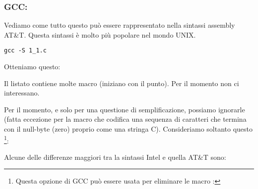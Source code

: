 \subsubsection{GCC: \ATTSyntax}
\label{ATT_syntax}

Vediamo come tutto questo può essere rappresentato nella sintassi assembly AT\&T.
Questa sintassi è molto più popolare nel mondo UNIX.

\begin{lstlisting}[caption=compiliamo in GCC 4.7.3]
gcc -S 1_1.c
\end{lstlisting}

Otteniamo questo:



Il listato contiene molte macro (iniziano con il punto). Per il momento non ci interessano.

Per il momento, e solo per una questione di semplificazione, possiamo ignorarle (fatta eccezione per la macro  che codifica una sequenza di caratteri che termina con il null-byte (zero) proprio come una stringa C). Consideriamo soltanto questo
\footnote{Questa opzione di GCC può essere usata per eliminare le macro : }:



\myindex{\ATTSyntax}
\myindex{\IntelSyntax}
Alcune delle differenze maggiori tra la sintassi Intel e quella AT\&T sono:

